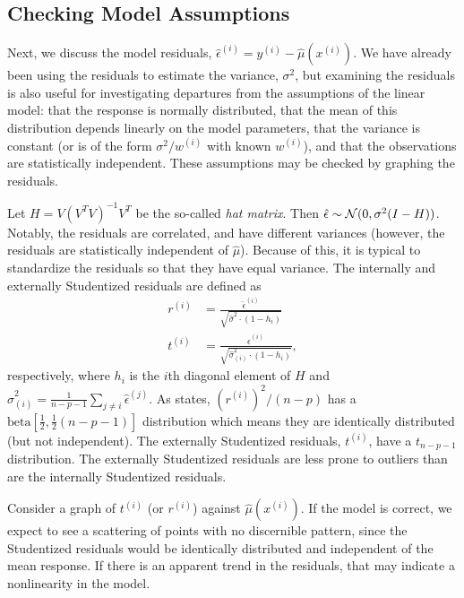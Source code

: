 \documentclass[12pt]{article}
\begin{document}
\subsection{Checking Model Assumptions}
Next, we discuss the model residuals, $\hat{\epsilon}^{(i)} = y^{(i)} - \hat{\mu}(x^{(i)})$. We have already been using the residuals to estimate the variance, $\sigma^2$, but examining the residuals is also useful for investigating departures from the assumptions of the linear model: that the response is normally distributed, that the mean of this distribution depends linearly on the model parameters, that the variance is constant (or is of the form $\sigma^2/w^{(i)}$ with known $w^{(i)}$), and that the observations are statistically independent. These assumptions may be checked by graphing the residuals.

Let $H = V (V^T V)^{-1} V^T$ be the so-called \textit{hat matrix}. Then $\hat{\epsilon} \sim {\mathcal N}(0, \sigma^2 (I - H))$. Notably, the residuals are correlated, and have different variances (however, the residuals are statistically independent of $\hat{\mu}$). Because of this, it is typical to standardize the residuals so that they have equal variance. The internally and externally Studentized residuals are defined as
\begin{align*}
   r^{(i)} &= \frac{\hat{\epsilon}^{(i)}}{\sqrt{\hat{\sigma}^2 \cdot (1 - h_i)}} \\
   t^{(i)} &= \frac{\hat{\epsilon}^{(i)}}{\sqrt{\hat{\sigma}_{(i)}^2 \cdot (1 - h_i)}},
\end{align*}
respectively, where $h_i$ is the $i$th diagonal element of $H$ and $\hat{\sigma}_{(i)}^2 = \frac{1}{n-p-1} \sum_{j \neq i} \hat{\epsilon}^{(j)}$. As \cite[\S~10.2]{Seber:2003} states, $(r^{(i)})^2/(n-p)$ has a $\textrm{beta}[\frac{1}{2}, \frac{1}{2}(n-p-1)]$ distribution which means they are identically distributed (but not independent). The externally Studentized residuals, $t^{(i)}$, have a $t_{n-p-1}$ distribution. The externally Studentized residuals are less prone to outliers than are the internally Studentized residuals.

Consider a graph of $t^{(i)}$ (or $r^{(i)}$) against $\hat{\mu}(x^{(i)})$. If the model is correct, we expect to see a scattering of points with no discernible pattern, since the Studentized residuals would be identically distributed and independent of the mean response. If there is an apparent trend in the residuals, that may indicate a nonlinearity in the model.
\end{document}
